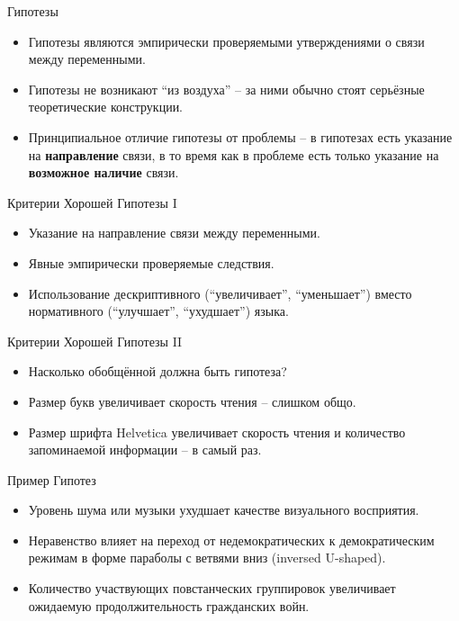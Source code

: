 \documentclass{beamer}
\begin{document}
\begin{frame}{Гипотезы}
\begin{itemize}
	\setlength\itemsep{1em}
	\item Гипотезы являются эмпирически проверяемыми утверждениями о связи между переменными. 
	\item Гипотезы не возникают ``из воздуха'' -- за ними обычно стоят серьёзные теоретические конструкции. 
	\item Принципиальное отличие гипотезы от проблемы -- в гипотезах есть указание на \textbf{направление} связи,  в то время как в проблеме есть только указание на \textbf{возможное наличие} связи. 
\end{itemize}
\end{frame}
\begin{frame}{Критерии Хорошей Гипотезы I}
\begin{itemize}
	\setlength\itemsep{3em}
	\item Указание на направление связи между переменными.
	\item Явные эмпирически проверяемые следствия. 
	\item Использование дескриптивного (``увеличивает'',  ``уменьшает'') вместо нормативного (``улучшает'',  ``ухудшает'') языка. 
\end{itemize}
\end{frame}
\begin{frame}{Критерии Хорошей Гипотезы II}
\begin{itemize}
	\setlength\itemsep{3em}
	\item Насколько обобщённой должна быть гипотеза? 
	\item Размер букв увеличивает скорость чтения -- слишком общо. 
	\item Размер шрифта Helvetica увеличивает скорость чтения и количество запоминаемой информации -- в самый раз. 
\end{itemize}
\end{frame}
\begin{frame}{Пример Гипотез}
\begin{itemize}
	\setlength\itemsep{3em}
	\item Уровень шума или музыки ухудшает качестве визуального восприятия. 
	\item Неравенство влияет на переход от недемократических к демократическим режимам в форме параболы с ветвями вниз (inversed U-shaped). 
	\item Количество участвующих повстанческих группировок увеличивает ожидаемую продолжительность гражданских войн. 
\end{itemize}
\end{frame}
\end{document}
